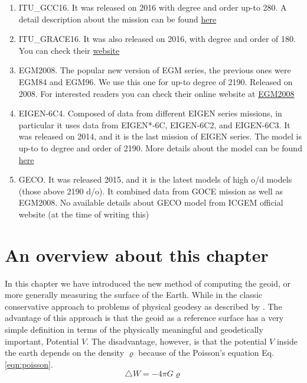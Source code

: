  \begin{enumerate}
 	\item {ITU\_GCC16}. It was released on 2016 with degree and order up-to 280. A detail description about the mission can be found \href{http://www.geo.itu.edu.tr/gravity/ITU\_GGC16.html}{here}
 	
 	
 	\item {ITU\_GRACE16}. It was also released on 2016, with degree and order of 180. You can check their \href{http://www.geo.itu.edu.tr/gravity/ITU\_GRACE16.html}{website}
 	
 	
 	
 	\item{EGM2008}. The popular new version of EGM series, the previous ones were EGM84 and EGM96. We use this one for up-to degree of 2190. Released on 2008. For interested readers you can check their online website at \href{http://earth-info.nima.mil/GandG/wgs84/gravitymod/egm2008/index.html}{EGM2008}
 	\item {EIGEN-6C4}. Composed of data from different EIGEN series missions, in particular it uses data from EIGEN*‐6C, EIGEN‐6C2, and EIGEN‐6C3. It was released on 2014, and it is the last mission of EIGEN series. The model is up-to to degree and order of 2190. More details about the model can be found \href{http://icgem.gfz-potsdam.de/ICGEM/documents/Foerste-et-al-EIGEN-6C4.pdf}{here}
 	
 	\item {GECO}. It was released 2015, and it is the latest models of high o/d models (those above 2190 d/o). It combined data from GOCE mission as well as EGM2008. No available details about GECO model from ICGEM official website (at the time of writing this)
 	
 \end{enumerate}
 
 
 \section{An overview about this chapter}
 
 In this chapter we have introduced the new method of computing the geoid, or more generally measuring the surface of the Earth. While in the classic conservative approach to problems of physical geodesy as described by \cite{hoffmann}. The advantage of this approach is that the geoid as a reference surface has a very simple definition in terms of the physically meaningful and geodetically important, Potential $V$. The disadvantage, however, is that the potential $V$ inside the earth depends on the  density $\varrho$ because of the Poisson's equation Eq. \eqref{eqn:poisson}. 
 \begin{equation}
 \label{eqn:poisson}
	 \triangle W = - 4 \pi G \varrho
 \end{equation} 
 
